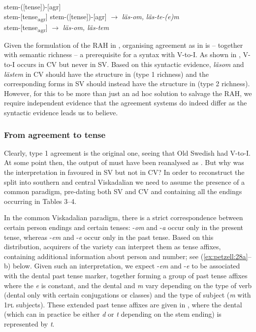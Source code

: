 \documentclass[output=paper,colorlinks,citecolor=brown,draft,draftmode]{langscibook}
\begin{document}
\ea\label{ex:petzell:26}
\ea\label{ex:petzell:26a}  stem-([tense])-[agr]\\
\ex\label{ex:petzell:26b}  stem-[tense\textsubscript{agr}]
\z
\ex\label{ex:petzell:27}
\ea\label{ex:petzell:27a}  stem-([tense])-[agr]  $\to$ \textit{läs-om,} \textit{läs-te-(e)m}\\
\ex\label{ex:petzell:27b}  stem-[tense\textsubscript{agr}]      $\to$ \textit{läs-om, läs-tem}
\z
\z


Given the formulation of the RAH in , organising agreement as in  is – together with semantic richness – a prerequisite for a syntax with V-to-I. As shown in , V-to-I occurs in CV but never in SV. Based on this syntactic evidence, \textit{läsom} and \textit{lästem} in CV should have the structure in  (type 1 richness) and the corresponding forms in SV should instead have the structure in  (type 2 richness). However, for this to be more than just an ad hoc solution to salvage the RAH, we require independent evidence that the agreement systems do indeed differ as the syntactic evidence leads us to believe.


\subsubsection{From agreement to tense}\label{sec:petzell:4.3.2}


Clearly, type 1 agreement is the original one, seeing that Old Swedish had V-to-I. At some point then, the output of  must have been reanalysed as . But why was the interpretation in  favoured in SV but not in CV? In order to reconstruct the split into southern and central Viskadalian we need to assume the presence of a common paradigm, pre-dating both SV and CV and containing all the endings occurring in Tables 3–4.



In the common Viskadalian paradigm, there is a strict correspondence between certain person endings and certain tenses: -\textit{om} and -\textit{a} occur only in the present tense, whereas -\textit{em} and -\textit{e} occur only in the past tense. Based on this distribution, acquirers of the variety can interpret them as tense affixes, containing additional information about person and number; see (\ref{ex:petzell:28a}–b) below. Given such an interpretation, we expect -\textit{em} and -\textit{e} to be associated with the dental past tense marker, together forming a group of past tense affixes where the \textit{e} is constant, and the dental and \textit{m} vary depending on the type of verb (dental only with certain conjugations or classes) and the type of subject (\textit{m} with 1\textsc{pl} subjects). These extended past tense affixes are given in , where the dental (which can in practice be either \textit{d} or \textit{t} depending on the stem ending) is represented by \textit{t}.
\end{document}
